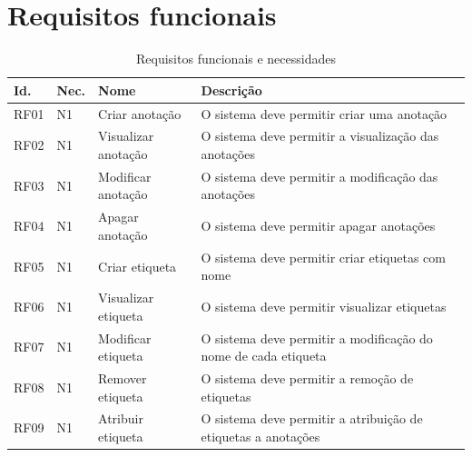 \documentclass[
	12pt,				%
	oneside,			%
	a4paper,			%
	english,			%
	brazil,				%
	]{abntex2}
\begin{document}
\section{Requisitos funcionais}
\IBGEtabfontsize
\begin{longtable}{@{}lllp{}@{}}
\caption{Requisitos funcionais e necessidades}
\label{tab:requisitos} \\
\toprule
\textbf{Id.} & \textbf{Nec.} & \textbf{Nome} & \textbf{Descrição} \\ \midrule
RF01 & N1 & Criar anotação & O sistema deve permitir criar uma anotação  \label{RF01} \\ \midrule
RF02 & N1 & Visualizar anotação & O sistema deve permitir a visualização das anotações  \label{RF02} \\ \midrule
RF03 & N1 & Modificar anotação & O sistema deve permitir a modificação das anotações  \label{RF03}\\ \midrule
RF04 & N1 & Apagar anotação & O sistema deve permitir apagar anotações  \label{RF04} \\ \midrule
RF05 & N1 & Criar etiqueta & O sistema deve permitir criar etiquetas com nome  \label{RF05} \\ \midrule
RF06 & N1 & Visualizar etiqueta & O sistema deve permitir visualizar etiquetas  \label{RF06} \\ \midrule
RF07 & N1 & Modificar etiqueta & O sistema deve permitir a modificação do nome de cada etiqueta \label{RF07} \\ \midrule
RF08 & N1 & Remover etiqueta & O sistema deve permitir a remoção de etiquetas  \label{RF08} \\ \midrule
RF09 & N1 & Atribuir etiqueta & O sistema deve permitir a atribuição de etiquetas a anotações  \label{RF09} \\ \midrule


\end{longtable}
\end{document}
